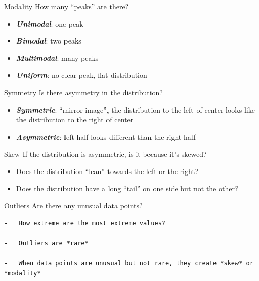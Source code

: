 \documentclass[
  ignorenonframetext,
]{beamer}
\begin{document}
\begin{frame}{Modality}
\label{modality}
How many ``peaks'' are there?

\begin{itemize}
\item
  \textbf{\emph{Unimodal}}: one peak
\item
  \textbf{\emph{Bimodal}}: two peaks
\item
  \textbf{\emph{Multimodal}}: many peaks
\item
  \textbf{\emph{Uniform}}: no clear peak, flat distribution
\end{itemize}
\end{frame}

\begin{frame}{Symmetry}
\label{symmetry}
Is there asymmetry in the distribution?

\begin{itemize}
\item
  \textbf{\emph{Symmetric}}: ``mirror image'', the distribution to the
  left of center looks like the distribution to the right of center
\item
  \textbf{\emph{Asymmetric}}: left half looks different than the right
  half
\end{itemize}
\end{frame}

\begin{frame}{Skew}
\label{skew}
If the distribution is asymmetric, is it because it's skewed?

\begin{itemize}
\item
  Does the distribution ``lean'' towards the left or the right?
\item
  Does the distribution have a long ``tail'' on one side but not the
  other?
\end{itemize}
\end{frame}

\begin{frame}[fragile]{Outliers}
\label{outliers}
Are there any unusual data points?

\begin{verbatim}
-   How extreme are the most extreme values?

-   Outliers are *rare*

-   When data points are unusual but not rare, they create *skew* or *modality*
\end{verbatim}
\end{frame}
\end{document}
